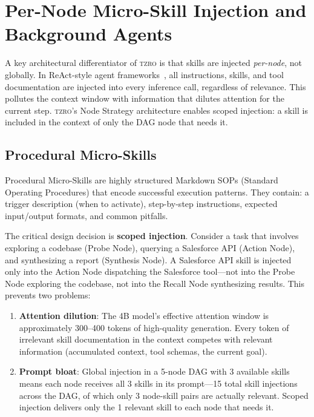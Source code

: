 \documentclass{article}
\begin{document}
\section{Per-Node Micro-Skill Injection and Background Agents}
\label{sec:micro_skills}

A key architectural differentiator of \textsc{tzro} is that skills are injected \emph{per-node}, not globally.
In ReAct-style agent frameworks~\cite{autogen2023,crewai2024}, all instructions, skills, and tool documentation are injected into every inference call, regardless of relevance.
This pollutes the context window with information that dilutes attention for the current step.
\textsc{tzro}'s Node Strategy architecture enables scoped injection: a skill is included in the context of only the DAG node that needs it.

\subsection{Procedural Micro-Skills}
\label{sec:procedural_skills}

Procedural Micro-Skills are highly structured Markdown SOPs (Standard Operating Procedures) that encode successful execution patterns.
They contain: a trigger description (when to activate), step-by-step instructions, expected input/output formats, and common pitfalls.

The critical design decision is \textbf{scoped injection}.
Consider a task that involves exploring a codebase (Probe Node), querying a Salesforce API (Action Node), and synthesizing a report (Synthesis Node).
A Salesforce API skill is injected only into the Action Node dispatching the Salesforce tool---not into the Probe Node exploring the codebase, not into the Recall Node synthesizing results.
This prevents two problems:

\begin{enumerate}[leftmargin=*]
\item \textbf{Attention dilution}: The 4B model's effective attention window is approximately 300--400 tokens of high-quality generation.
Every token of irrelevant skill documentation in the context competes with relevant information (accumulated context, tool schemas, the current goal).
\item \textbf{Prompt bloat}: Global injection in a 5-node DAG with 3 available skills means each node receives all 3 skills in its prompt---15 total skill injections across the DAG, of which only 3 node-skill pairs are actually relevant.
Scoped injection delivers only the 1 relevant skill to each node that needs it.
\end{enumerate}
\end{document}
